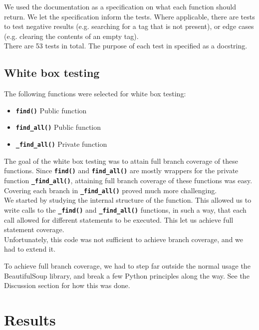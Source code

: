 \documentclass[10pt]{article}
\newcommand{\tbt}[1]{\texttt{\textbf{#1}}}
\begin{document}
We used the documentation as a specification on what each function should return. We let the specification inform the tests. Where applicable, there are tests to test negative results (e.g. searching for a tag that is not present), or edge cases (e.g. clearing the contents of an empty tag). \\

There are 53 tests in total. The purpose of each test in specified as a docstring.


\subsection{White box testing}

The following functions were selected for white box testing:

\begin{itemize}
  \setlength\itemsep{-0.05em}
  \item \tbt{find()} \qquad Public function
  \item \tbt{find\_all()} \qquad Public function
  \item \tbt{\_find\_all()} \qquad Private function
\end{itemize}

The goal of the white box testing was to attain full branch coverage of these functions. Since \texttt{\textbf{find()}} and \texttt{\textbf{find\_all()}} are mostly wrappers for the private function \texttt{\textbf{\_find\_all()}}, attaining full branch coverage of these functions was easy. Covering each branch in \texttt{\textbf{\_find\_all()}} proved much more challenging. \\

We started by studying the internal structure of the function. This allowed us to write calls to the \tbt{\_find()} and \tbt{\_find\_all()} functions, in such a way, that each call allowed for different statements to be executed. This let us achieve full statement coverage. \\

Unfortunately, this code was not sufficient to achieve branch coverage, and we had to extend it.

To achieve full branch coverage, we had to step far outside the normal usage the BeautifulSoup library, and break a few Python principles along the way. See the Discussion section for how this was done.

\section{Results}
\end{document}
